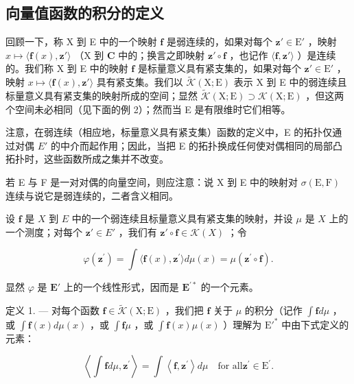 \subsection{向量值函数的积分的定义}

回顾一下，称 X 到 E 中的一个映射 \(\mathbf{f}\) 是弱连续的，如果对每个 \(\mathbf{z}' \in \mathrm{E}'\) ，映射 \(x \mapsto \langle \mathbf{f}(x), \mathbf{z}' \rangle\) （X 到 \(\mathbf{C}\) 中的；换言之即映射 \(\mathbf{z}' \circ \mathbf{f}\) ，也记作 \(\langle \mathbf{f}, \mathbf{z}' \rangle\) ）是连续的。我们称 X 到 E 中的映射 \(\mathbf{f}\) 是标量意义具有紧支集的，如果对每个 \(\mathbf{z}' \in \mathrm{E}'\) ，映射 \(x \mapsto \langle \mathbf{f}(x), \mathbf{z}' \rangle\) 具有紧支集。我们以 \(\widetilde{\mathcal{K}}(\mathrm{X};\mathrm{E})\) 表示 X 到 E 中的弱连续且标量意义具有紧支集的映射所成的空间；显然 \(\widetilde{\mathcal{K}}(\mathrm{X};\mathrm{E}) \supset \mathcal{K}(\mathrm{X};\mathrm{E})\) ，但这两个空间未必相同（见下面的例 2）；然而当 E 是有限维时它们相等。

注意，在弱连续（相应地，标量意义具有紧支集）函数的定义中，E 的拓扑仅通过对偶 \(E'\) 的中介而起作用；因此，当把 E 的拓扑换成任何使对偶相同的局部凸拓扑时，这些函数所成之集并不改变。

若 E 与 F 是一对对偶的向量空间，则应注意：说 X 到 E 中的映射对 \(\sigma(\mathrm{E},\mathrm{F})\) 连续与说它是弱连续的，二者含义相同。

设 \(\mathbf{f}\) 是 \(X\) 到 \(E\) 中的一个弱连续且标量意义具有紧支集的映射，并设 \(\mu\) 是 \(X\) 上的一个测度；对每个 \(\mathbf{z}' \in E'\) ，我们有 \(\mathbf{z}' \circ \mathbf{f} \in \mathcal{K}(X)\) ；令

\[
\varphi (\mathbf {z} ^ {\prime}) = \int \langle \mathbf {f} (x), \mathbf {z} ^ {\prime} \rangle d \mu (x) = \mu (\mathbf {z} ^ {\prime} \circ \mathbf {f}).
\]

显然 \(\varphi\) 是 \(\mathbf{E}'\) 上的一个线性形式，因而是 \(\mathbf{E}^{\prime*}\) 的一个元素。

定义 1. --- 对每个函数 \(\mathbf{f} \in \widetilde{\mathcal{K}}(\mathrm{X};\mathrm{E})\) ，我们把 \(\mathbf{f}\) 关于 \(\mu\) 的积分（记作 \(\int \mathbf{f} d\mu\) ，或 \(\int \mathbf{f}(x) d\mu(x)\) ，或 \(\int \mathbf{f}\mu\) ，或 \(\int \mathbf{f}(x)\mu(x)\) ）理解为 \(\mathrm{E}'^*\) 中由下式定义的元素：

\[
\left\langle \int \mathbf {f} d \mu , \mathbf {z} ^ {\prime} \right\rangle = \int \left\langle \mathbf {f}, \mathbf {z} ^ {\prime} \right\rangle d \mu \quad \text {for all} \mathbf {z} ^ {\prime} \in \mathrm{E} ^ {\prime}.\tag{1}
\]

